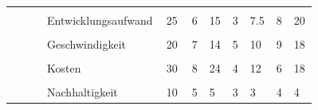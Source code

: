 \documentclass[main.tex]{subfiles} %
\begin{document}
\begin{landscape}
\begin{table}[H]
\begin{tabular}{|p{0.11\linewidth}|p{0.18\linewidth}|p{0.085\linewidth}|p{0.057\linewidth}|p{0.07\linewidth}|p{0.057\linewidth}|p{0.07\linewidth}|p{0.057\linewidth}|p{0.07\linewidth}|}
            \cline{2-9}
                                                      &                                     &                                            &                                           &                                            &            &             &            &             \\[-9pt]
                                                      & Entwicklungsaufwand                 & 25                                         & 6                                         & 15                                         & 3          & 7.5         & 8          & 20          \\[1pt]
            \cline{2-9}
                                                      &                                     &                                            &                                           &                                            &            &             &            &             \\[-9pt]
                                                      & Geschwindigkeit                     & 20                                         & 7                                         & 14                                         & 5          & 10          & 9          & 18          \\[1pt]
            \cline{2-9}
                                                      &                                     &                                            &                                           &                                            &            &             &            &             \\[-9pt]
                                                      & Kosten                              & 30                                         & 8                                         & 24                                         & 4          & 12          & 6          & 18          \\[1pt]
            \cline{2-9}
                                                      &                                     &                                            &                                           &                                            &            &             &            &             \\[-9pt]
                                                      & Nachhaltigkeit                      & 10                                         & 5                                         & 5                                          & 3          & 3           & 4          & 4           \\[1pt]

\end{tabular}
\end{table}
\end{landscape}
\end{document}
